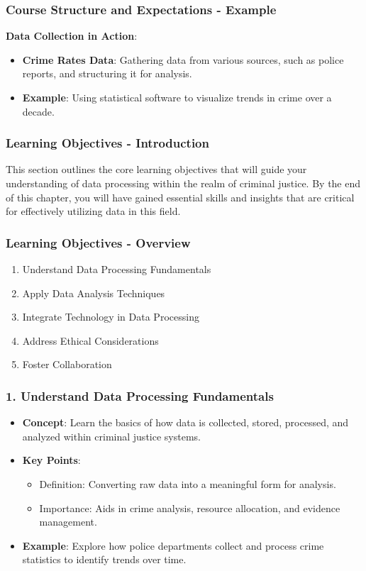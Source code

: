 \documentclass[aspectratio=169]{beamer}
\begin{document}
\begin{frame}[fragile]
    \frametitle{Course Structure and Expectations - Example}
    \textbf{Data Collection in Action}:
    \begin{itemize}
        \item \textbf{Crime Rates Data}: Gathering data from various sources, such as police reports, and structuring it for analysis.
        \item \textbf{Example}: Using statistical software to visualize trends in crime over a decade.
    \end{itemize}
\end{frame}

\begin{frame}[fragile]
    \frametitle{Learning Objectives - Introduction}
    This section outlines the core learning objectives that will guide your understanding of data processing within the realm of criminal justice. By the end of this chapter, you will have gained essential skills and insights that are critical for effectively utilizing data in this field.
\end{frame}

\begin{frame}[fragile]
    \frametitle{Learning Objectives - Overview}
    \begin{enumerate}
        \item Understand Data Processing Fundamentals
        \item Apply Data Analysis Techniques
        \item Integrate Technology in Data Processing
        \item Address Ethical Considerations
        \item Foster Collaboration
    \end{enumerate}
\end{frame}

\begin{frame}[fragile]
    \frametitle{1. Understand Data Processing Fundamentals}
    \begin{itemize}
        \item \textbf{Concept}: Learn the basics of how data is collected, stored, processed, and analyzed within criminal justice systems.
        \item \textbf{Key Points}:
        \begin{itemize}
            \item Definition: Converting raw data into a meaningful form for analysis.
            \item Importance: Aids in crime analysis, resource allocation, and evidence management.
        \end{itemize}
        \item \textbf{Example}: Explore how police departments collect and process crime statistics to identify trends over time.
    \end{itemize}
\end{frame}
\end{document}
